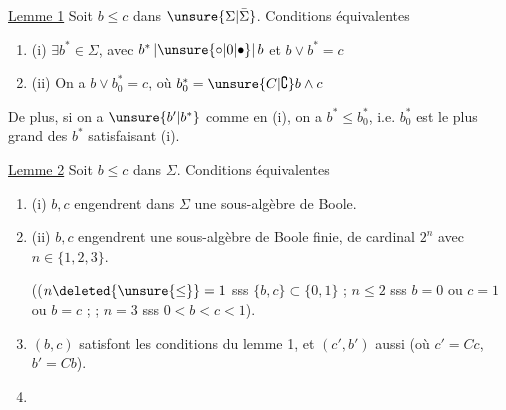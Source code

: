 
\uline{Lemme 1} Soit $b\leq c$ dans $\unsure{\Sigma|\bar\Sigma}$. Conditions équivalentes
\begin{enumerate}[label={},leftmargin=1.8em]
\item (i) $\exists b^*\in\Sigma$, avec $b^*\,|\unsure{\circ|0|\bullet}|\,b$ et $b\vee b^*=c$
\item (ii) On a $b\vee b_0^*=c$, où $b_0^*=\unsure{C|\complement}b\wedge c$
\end{enumerate}
De plus, si on a $\unsure{b'|b^*}$ comme en (i), on a $b^*\leq b_0^*$, i.e. $b_0^*$ est le plus grand des $b^*$ satisfaisant (i).

\uline{Lemme 2} Soit $b\leq c$ dans $\Sigma$. Conditions équivalentes
\begin{enumerate}[label={},leftmargin=1.8em]
\item (i) $b,c$ engendrent dans $\Sigma$  une sous-algèbre de Boole.
\item (ii) $b,c$ engendrent une sous-algèbre de Boole finie, de cardinal $2^n$ avec $n\in\{1,2,3\}$.

 (($n\deleted{\unsure{\leq}}=1$ sss $\{b,c\}\subset\{0,1\}$ ; $n\leq2$ sss $b=0$ ou $c=1$ ou $b=c$ ;    ; $n=3$ sss $0<b<c<1$).
\item {} $(b,c)$ satisfont les conditions du lemme 1, et $(c',b')$ aussi (où $c'=Cc$, $b'=Cb$).
\item {}
\end{enumerate}

